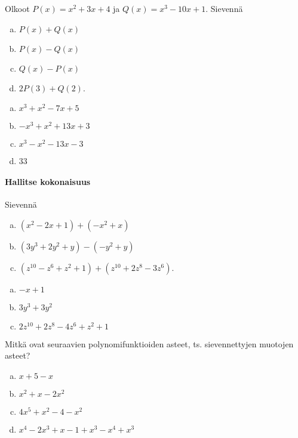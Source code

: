 \begin{tehtavasivu}
\begin{tehtava}
    Olkoot $P(x)=x^2+3x+4$ ja $Q(x)=x^3-10x+1$. Sievennä
    \begin{enumerate}[a)]
        \item $P(x)+Q(x)$
        \item $P(x)-Q(x)$
        \item $Q(x)-P(x)$
        \item $2P(3)+Q(2)$.
    \end{enumerate}
    \begin{vastaus}
        \begin{enumerate}[a)]
            \item $x^3+x^2-7x+5$ %
            \item $-x^3+x^2+13x+3$ %
            \item $x^3-x^2-13x-3$ %
            \item $33$ %
        \end{enumerate}
    \end{vastaus}
\end{tehtava}



\paragraph*{Hallitse kokonaisuus}

\begin{tehtava}
    Sievennä
    \begin{enumerate}[a)]
        \item $(x^2 - 2x + 1) + (-x^2 + x) $
        \item $(3y^3 + 2y^2  + y) - (-y^2 + y)$
        \item $(z^{10} - z^6 + z^2 + 1) + (z^{10} + 2z^8 - 3z^6)$.
    \end{enumerate}
    \begin{vastaus}
        \begin{enumerate}[a)]
            \item $-x + 1$
            \item $3y^3 + 3y^2$
            \item $2z^{10} + 2z^8 - 4z^6 + z^2 + 1$
        \end{enumerate}
    \end{vastaus}
\end{tehtava}

\begin{tehtava}
	Mitkä ovat seuraavien polynomifunktioiden asteet, ts. sievennettyjen muotojen asteet?
	\begin{enumerate}[a)]
		\item $x+5-x$
		\item $x^2+x-2x^2$
		\item $4x^5+x^2-4-x^2$
		\item $x^4-2x^3+x-1+x^3-x^4+x^3$
	\end{enumerate}


\end{tehtava}
\end{tehtavasivu}
